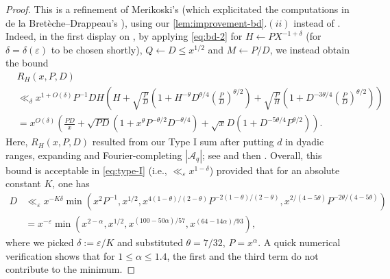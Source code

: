 \documentclass[reqno,11pt]{amsart}
\theoremstyle{remark}
\numberwithin{equation}{section}
\newcommand{\mA}{\mathcal{A}}
\newcommand{\eps}{\varepsilon}
\begin{document}
\begin{proof}
This is a refinement of Merikoski's \cite[Prop.\,1]{merikoski2023largest} (which explicitated the computations in de la Bret\`eche--Drappeau's \cite[\S 8.4]{de2020niveau}), using our \cref{lem:improvement-bd}.$(ii)$ instead of \cite[(8.7)]{de2020niveau}. Indeed, in the first display on \cite[p.\,1620]{de2020niveau}, by applying \cref{eq:bd-2} for $H \gets P X^{-1+\delta}$ (for $\delta = \delta(\eps)$ to be chosen shortly), $Q \gets D \le x^{1/2}$ and $M \gets P/D$, we instead obtain the bound
\[
\begin{aligned}
    &R_H(x, P, D)
    \\
    &\ll_{\delta}
    x^{1+O(\delta)} P^{-1} D H\left(
    H + \sqrt{\frac{P}{D}} \left(1 + H^{-\theta} D^{\theta/4} \left(\frac{P}{D}\right)^{\theta/2}\right) + \sqrt{\frac{P}{H}}\left(1 + D^{-3\theta/4} \left(\frac{P}{D}\right)^{\theta/2} \right)\right)
    \\
    &= 
    x^{O(\delta)} \left( \frac{PD}{x} + \sqrt{PD} \left(1 + x^\theta P^{-\theta/2} D^{-\theta/4}\right) + \sqrt{x}D \left(1 + D^{-5\theta/4} P^{\theta/2}\right) \right).
\end{aligned}
\]
Here, $R_H(x, P, D)$ resulted from our Type I sum after putting $d$ in dyadic ranges, expanding and Fourier-completing $|\mA_q|$; see \cite[\S 8.4]{de2020niveau} and then \cite[\S 4, 5]{deshouillers1982greatest}. Overall, this bound is acceptable in \cref{eq:type-I} (i.e., $\ll_\eps x^{1-\delta}$) provided that for an absolute constant $K$, one has
\[
\begin{aligned}
    D 
    &\ll_\eps x^{-K\delta} \min \left( x^2 P^{-1}, x^{1/2}, x^{4(1-\theta)/(2-\theta)} P^{-2(1-\theta)/(2-\theta)}, x^{2/(4-5\theta)} P^{-2\theta/(4-5\theta)} \right)
    \\
    &=
    x^{-\eps} \min \left(x^{2-\alpha}, x^{1/2}, x^{(100 - 50\alpha)/57}, x^{(64 - 14\alpha)/93}\right),
\end{aligned}
\]
where we picked $\delta := \eps/K$ and substituted $\theta = 7/32$, $P = x^\alpha$. A quick numerical verification shows that for $1 \le \alpha \le 1.4$, the first and the third term do not contribute to the minimum.
\end{proof}
\end{document}
